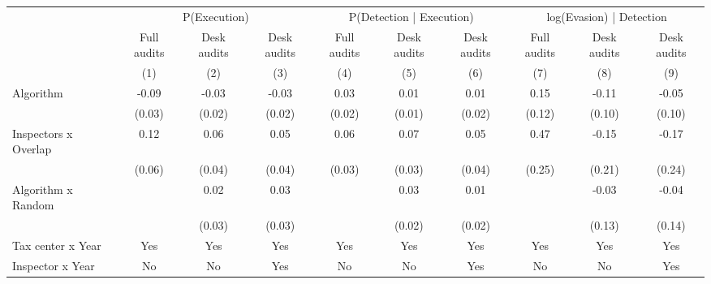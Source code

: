 \begin{tabular}{lccc|ccc|ccc} \toprule
\multicolumn{1}{l}{} & \multicolumn{3}{c}{P(Execution)} & \multicolumn{3}{c}{P(Detection | Execution)} & \multicolumn{3}{c}{log(Evasion) | Detection} \\\cmidrule(lr){2-4}\cmidrule(lr){5-7}\cmidrule(lr){8-10} \multicolumn{1}{l}{} & Full audits & Desk audits & Desk audits & Full audits & Desk audits & Desk audits & Full audits & Desk audits & Desk audits \\ \multicolumn{1}{l}{} & (1) & (2) & (3) & (4) & (5) & (6) & (7) & (8) & (9) \\ \midrule
Algorithm   &       -0.09\sym{***}&       -0.03\sym{*}  &       -0.03\sym{**} &        0.03\sym{**} &        0.01         &        0.01         &        0.15         &       -0.11         &       -0.05         \\
            &      (0.03)         &      (0.02)         &      (0.02)         &      (0.02)         &      (0.01)         &      (0.02)         &      (0.12)         &      (0.10)         &      (0.10)         \\
\addlinespace
Inspectors x Overlap&        0.12\sym{*}  &        0.06         &        0.05         &        0.06\sym{*}  &        0.07\sym{**} &        0.05         &        0.47\sym{*}  &       -0.15         &       -0.17         \\
            &      (0.06)         &      (0.04)         &      (0.04)         &      (0.03)         &      (0.03)         &      (0.04)         &      (0.25)         &      (0.21)         &      (0.24)         \\
\addlinespace
Algorithm x Random&                     &        0.02         &        0.03         &                     &        0.03         &        0.01         &                     &       -0.03         &       -0.04         \\
            &                     &      (0.03)         &      (0.03)         &                     &      (0.02)         &      (0.02)         &                     &      (0.13)         &      (0.14)         \\
\midrule
Tax center x Year&         Yes         &         Yes         &         Yes         &         Yes         &         Yes         &         Yes         &         Yes         &         Yes         &         Yes         \\
Inspector x Year&          No         &          No         &         Yes         &          No         &          No         &         Yes         &          No         &          No         &         Yes         \\

\end{tabular}
